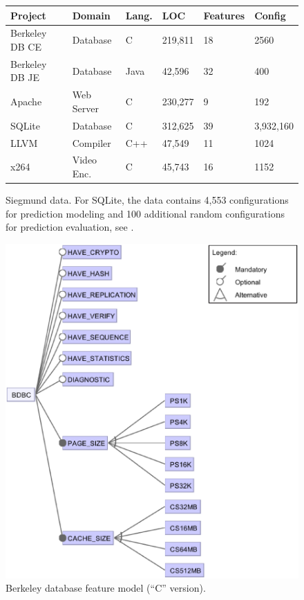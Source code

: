 \documentclass{sig-alternate}
\begin{document}
 \begin{figure}[!t]
\scriptsize
\begin{tabular}{llllll}
  \hline
  \rowcolor{lightgray}
Project & Domain & Lang. & LOC & Features & Config\\\hline
Berkeley DB CE & Database & C & 219,811 & 18 & 2560\\
Berkeley DB JE & Database & Java & 42,596 & 32  & 400\\
Apache & Web Server & C & 230,277 & 9 & 192\\
SQLite & Database & C & 312,625 & 39 & 3,932,160\\
LLVM & Compiler & C++ & 47,549 & 11 & 1024\\
x264 & Video Enc. & C& 45,743 & 16 & 1152\\\hline
\end{tabular}
 
\caption{Siegmund data.
For SQLite, the data  contains 4,553 configurations for prediction modeling and 100 additional random configurations for prediction evaluation, see \cite{vapp}.}\label{fig:cpm}
\end{figure}

\begin{figure}[!t]
\includegraphics[width=1\linewidth]{_figs/BDBC.eps}
\caption{ Berkeley database feature model   (``C'' version). }\label{fig:bdbc}
\end{figure}
\end{document}
